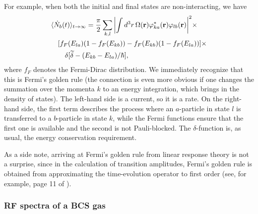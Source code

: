 \documentclass[prl,
twocolumn,
nofootinbib,
amsmath,amssymb,
aps]{revtex4-1}
\newcommand{\f}[2]{\frac{#1}{#2}}
\begin{document}
For example, when both the initial and final states are non-interacting, we have
\begin{align}
\label{eq:noninteracting}
&\langle \dot N_b(t) \rangle_{t\to \infty}
= \f{\pi}{2} \sum_{k,l} \abs{ \int d^3 r\,  \Omega(\mathbf{r}) \varphi_{ka}^*(\mathbf{r}) \varphi_{lb} (\mathbf{r})}^2  \times \nonumber\\
&\quad [f_F(E_{la}) ( 1 - f_F(E_{kb})) - f_F(E_{kb})(1 - f_F(E_{la}))] \times \nonumber\\
&\quad\quad \delta[\widetilde{\delta} - (E_{kb} - E_{la})/\hbar],
\end{align}
where $f_F$ denotes the Fermi-Dirac distribution. We immediately recognize that this is Fermi's golden rule (the connection is even more obvious if one changes the summation over the momenta $k$ to an energy integration, which brings in the density of states). The left-hand side is a current, so it is a rate. On the right-hand side, the first term describes the process where an $a$-particle in state $l$ is transferred to a $b$-particle in state $k$, while the Fermi functions ensure that the first one is available and the second is not Pauli-blocked. The $\delta$-function is, as usual,  the energy conservation requirement. 

As a side note, arriving at Fermi's golden rule from linear response theory is not a surprise, since in the calculation of transition amplitudes, Fermi's golden rule is obtained from approximating the time-evolution operator to first order (see, for example, page 11 of \cite{cohen1998atom}). 

\subsubsection{RF spectra of a BCS gas}\label{sec:rf}
\end{document}
